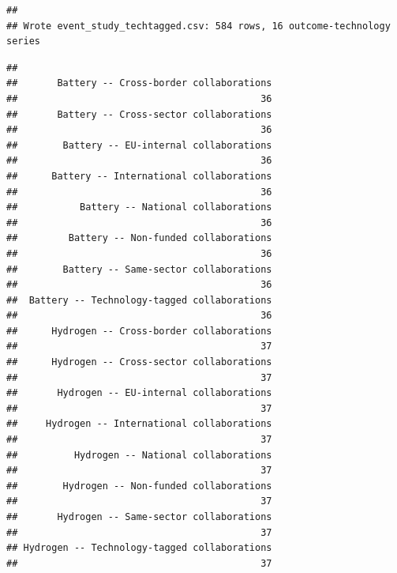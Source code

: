 \documentclass[
]{article}
\newenvironment{Shaded}{\begin{snugshade}}{\end{snugshade}}
\newcommand{\AttributeTok}[1]{\textcolor[rgb]{0.13,0.29,0.53}{#1}}
\newcommand{\ConstantTok}[1]{\textcolor[rgb]{0.56,0.35,0.01}{#1}}
\newcommand{\FunctionTok}[1]{\textcolor[rgb]{0.13,0.29,0.53}{\textbf{#1}}}
\newcommand{\NormalTok}[1]{#1}
\newcommand{\SpecialCharTok}[1]{\textcolor[rgb]{0.81,0.36,0.00}{\textbf{#1}}}
\newcommand{\StringTok}[1]{\textcolor[rgb]{0.31,0.60,0.02}{#1}}
\begin{document}
\begin{Shaded}
\end{Shaded}

\begin{verbatim}
## 
## Wrote event_study_techtagged.csv: 584 rows, 16 outcome-technology series
\end{verbatim}

\begin{Shaded}
\end{Shaded}

\begin{verbatim}
## 
##       Battery -- Cross-border collaborations 
##                                           36 
##       Battery -- Cross-sector collaborations 
##                                           36 
##        Battery -- EU-internal collaborations 
##                                           36 
##      Battery -- International collaborations 
##                                           36 
##           Battery -- National collaborations 
##                                           36 
##         Battery -- Non-funded collaborations 
##                                           36 
##        Battery -- Same-sector collaborations 
##                                           36 
##  Battery -- Technology-tagged collaborations 
##                                           36 
##      Hydrogen -- Cross-border collaborations 
##                                           37 
##      Hydrogen -- Cross-sector collaborations 
##                                           37 
##       Hydrogen -- EU-internal collaborations 
##                                           37 
##     Hydrogen -- International collaborations 
##                                           37 
##          Hydrogen -- National collaborations 
##                                           37 
##        Hydrogen -- Non-funded collaborations 
##                                           37 
##       Hydrogen -- Same-sector collaborations 
##                                           37 
## Hydrogen -- Technology-tagged collaborations 
##                                           37
\end{verbatim}
\end{document}
